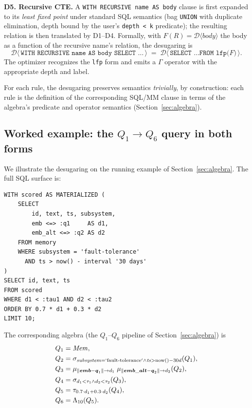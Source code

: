 \documentclass[sigconf,nonacm,review]{acmart}
\theoremstyle{plain}
\theoremstyle{definition}
\newcommand{\vect}[1]{\boldsymbol{#1}}
\newcommand{\Mem}{\mathit{Mem}}
\theoremstyle{remark}
\begin{document}
\textbf{D5. Recursive CTE.} A \texttt{WITH RECURSIVE name AS
body} clause is first expanded to its \emph{least fixed point}
under standard SQL semantics (bag \texttt{UNION} with
duplicate elimination, depth bound by the user's
\texttt{depth < k} predicate); the resulting relation is then
translated by D1--D4. Formally, with $F(R) = \mathcal{D}\!\langle body \rangle$
the body as a function of the recursive name's relation, the
desugaring is
\[
\mathcal{D}\!\langle\,\texttt{WITH RECURSIVE name AS body SELECT \ldots}\,\rangle
  \;=\; \mathcal{D}\!\langle\,\texttt{SELECT \ldots FROM lfp($F$)}\,\rangle.
\]
The optimizer recognizes the \texttt{lfp} form and emits a
$\Gamma$ operator with the appropriate depth and label.

For each rule, the desugaring preserves semantics
\emph{trivially}, by construction: each rule is the definition
of the corresponding SQL/MM clause in terms of the algebra's
predicate and operator semantics (Section~\ref{sec:algebra}).

\subsection{Worked example: the $Q_1 \to Q_6$ query in both forms}\label{sec:sql:example}

We illustrate the desugaring on the running example of
Section~\ref{sec:algebra}. The full SQL surface is:
\begin{lstlisting}
WITH scored AS MATERIALIZED (
    SELECT
        id, text, ts, subsystem,
        emb <=> :q1     AS d1,
        emb_alt <=> :q2 AS d2
    FROM memory
    WHERE subsystem = 'fault-tolerance'
      AND ts > now() - interval '30 days'
)
SELECT id, text, ts
FROM scored
WHERE d1 < :tau1 AND d2 < :tau2
ORDER BY 0.7 * d1 + 0.3 * d2
LIMIT 10;
\end{lstlisting}

The corresponding algebra (the $Q_1$--$Q_6$ pipeline of
Section~\ref{sec:algebra}) is
\begin{align*}
Q_1 &= \Mem, \\
Q_2 &= \sigma_{\mathit{subsystem} = \mathrm{`fault\text{-}tolerance'} \wedge \mathit{ts} > \mathrm{now}() - 30d}(Q_1), \\
Q_3 &= \mu_{\lVert\vect{emb} - \vect{q}_1\rVert \to d_1}\;
        \mu_{\lVert\vect{emb\_alt} - \vect{q}_2\rVert \to d_2}(Q_2), \\
Q_4 &= \sigma_{d_1 < \tau_1 \wedge d_2 < \tau_2}(Q_3), \\
Q_5 &= \tau_{0.7\cdot d_1 + 0.3\cdot d_2}(Q_4), \\
Q_6 &= \Lambda_{10}(Q_5).
\end{align*}
\end{document}
